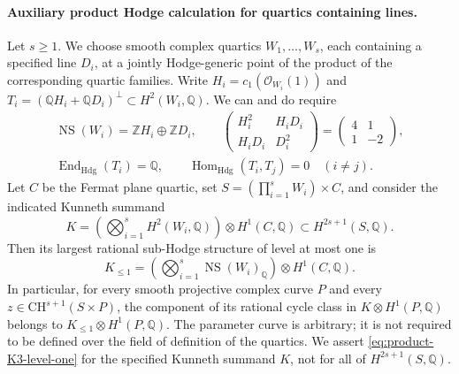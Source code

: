 \paragraph{Auxiliary product Hodge calculation for quartics containing lines.}
Let $s\geq1$. We choose smooth complex quartics $W_1,\ldots,W_s$, each
containing a specified line $D_i$, at a jointly Hodge-generic point of
the product of the corresponding quartic families. Write
$H_i=c_1(\mathcal O_{W_i}(1))$ and
$T_i=(\mathbb QH_i+\mathbb QD_i)^\perp\subset H^2(W_i,\mathbb Q)$.
We can and do require
\begin{equation}\label{eq:product-K3-generic-data}
 \begin{gathered}
 \operatorname{NS}(W_i)=\mathbb ZH_i\oplus\mathbb ZD_i,
 \qquad
 \begin{pmatrix}H_i^2&H_iD_i\\H_iD_i&D_i^2\end{pmatrix}
       =\begin{pmatrix}4&1\\1&-2\end{pmatrix},\\
 \operatorname{End}_{\mathrm{Hdg}}(T_i)=\mathbb Q,
 \qquad
 \operatorname{Hom}_{\mathrm{Hdg}}(T_i,T_j)=0\quad(i\ne j).
 \end{gathered}
\end{equation}
Let $C$ be the Fermat plane quartic, set
$S=(\prod_{i=1}^sW_i)\times C$, and consider the indicated Kunneth
summand
\[
 K=\left(\bigotimes_{i=1}^sH^2(W_i,\mathbb Q)\right)
                       \otimes H^1(C,\mathbb Q)
       \subset H^{2s+1}(S,\mathbb Q).
\]
Then its largest rational sub-Hodge structure of level at most one is
\begin{equation}\label{eq:product-K3-level-one}
 K_{\leq1}=
 \left(\bigotimes_{i=1}^s\operatorname{NS}(W_i)_{\mathbb Q}\right)
                       \otimes H^1(C,\mathbb Q).
\end{equation}
In particular, for every smooth projective complex curve $P$ and every
$z\in\mathrm{CH}^{s+1}(S\times P)$, the component of its rational
cycle class in $K\otimes H^1(P,\mathbb Q)$ belongs to
$K_{\leq1}\otimes H^1(P,\mathbb Q)$. The parameter curve is arbitrary;
it is not required to be defined over the field of definition of the
quartics. We assert \eqref{eq:product-K3-level-one} for the specified
Kunneth summand $K$, not for all of $H^{2s+1}(S,\mathbb Q)$.

